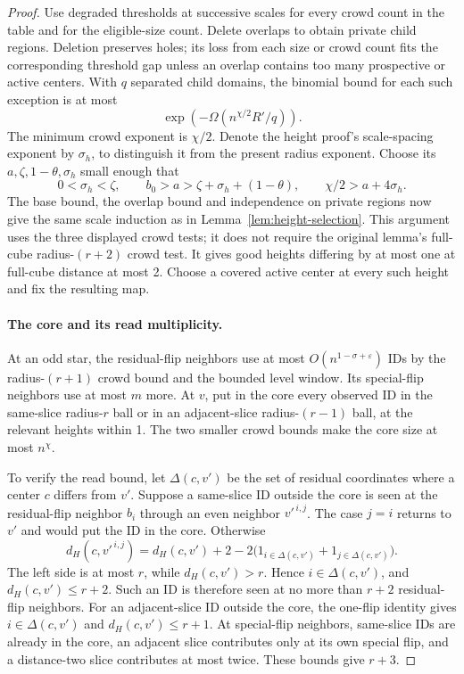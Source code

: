 \begin{proof}
Use degraded thresholds at successive scales for every crowd count in the table and for the eligible-size count. Delete overlaps to obtain private child regions. Deletion preserves holes; its loss from each size or crowd count fits the corresponding threshold gap unless an overlap contains too many prospective or active centers. With \(q\) separated child domains, the binomial bound for each such exception is at most
\[
 \exp(-\Omega(n^{\chi/2}R'/q)).
\]
The minimum crowd exponent is \(\chi/2\). Denote the height proof's scale-spacing exponent by \(\sigma_h\), to distinguish it from the present radius exponent. Choose its \(a,\zeta,1-\theta,\sigma_h\) small enough that
\[
 0<\sigma_h<\zeta,\qquad
 b_0>a>\zeta+\sigma_h+(1-\theta),\qquad
 \chi/2>a+4\sigma_h.
\]
The base bound, the overlap bound and independence on private regions now give the same scale induction as in Lemma~\ref{lem:height-selection}. This argument uses the three displayed crowd tests; it does not require the original lemma's full-cube radius-\((r+2)\) crowd test. It gives good heights differing by at most one at full-cube distance at most 2. Choose a covered active center at every such height and fix the resulting map.

\paragraph{The core and its read multiplicity.}
At an odd star, the residual-flip neighbors use at most \(O(n^{1-\sigma+\varepsilon})\) IDs by the radius-\((r+1)\) crowd bound and the bounded level window. Its special-flip neighbors use at most \(m\) more. At \(v\), put in the core every observed ID in the same-slice radius-\(r\) ball or in an adjacent-slice radius-\((r-1)\) ball, at the relevant heights within 1. The two smaller crowd bounds make the core size at most \(n^\chi\).

To verify the read bound, let \(\Delta(c,v')\) be the set of residual coordinates where a center \(c\) differs from \(v'\). Suppose a same-slice ID outside the core is seen at the residual-flip neighbor \(b_i\) through an even neighbor \(v'^{\,i,j}\). The case \(j=i\) returns to \(v'\) and would put the ID in the core. Otherwise
\[
 d_H(c,v'^{\,i,j})=d_H(c,v')+2
   -2\bigl(1_{i\in\Delta(c,v')}+1_{j\in\Delta(c,v')}\bigr).
\]
The left side is at most \(r\), while \(d_H(c,v')>r\). Hence \(i\in\Delta(c,v')\), and \(d_H(c,v')\le r+2\). Such an ID is therefore seen at no more than \(r+2\) residual-flip neighbors. For an adjacent-slice ID outside the core, the one-flip identity gives \(i\in\Delta(c,v')\) and \(d_H(c,v')\le r+1\). At special-flip neighbors, same-slice IDs are already in the core, an adjacent slice contributes only at its own special flip, and a distance-two slice contributes at most twice. These bounds give \(r+3\).


\end{proof}
